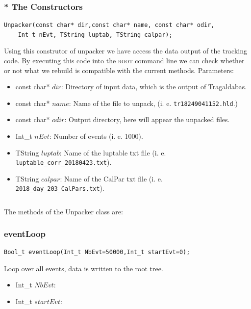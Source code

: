 \documentclass[a4paper]{book}
\begin{document}
\subsubsection{* The Constructors}

\begin{lstlisting}
Unpacker(const char* dir,const char* name, const char* odir, 
	Int_t nEvt, TString luptab, TString calpar);
\end{lstlisting}

Using this construtor of unpacker we have access the data output of the tracking code. By executing this code into the \textsc{root} command line we can check whether or not what we rebuild is compatible with the current methods. Parameters:

\begin{itemize}
	\item const char* $dir$: Directory of input data, which is the output of Tragaldabas.
	\item const char* $name$: Name of the file to unpack, (i. e. \texttt{tr18249041152.hld}.)
	\item const char* $odir$: Output directory, here will appear the unpacked files.
	\item Int\_t $nEvt$: Number of events (i. e. 1000).
	\item TString $luptab$: Name of the luptable txt file (i. e. \texttt{luptable\_corr\_20180423.txt}).
	\item TString $calpar$: Name of the CalPar txt file (i. e. \texttt{2018\_day\_203\_CalPars.txt}).
\end{itemize}

\[\]

The methods of the Unpacker class are:

\subsubsection{eventLoop}

\begin{lstlisting}
Bool_t eventLoop(Int_t NbEvt=50000,Int_t startEvt=0);
\end{lstlisting}

Loop over all events, data is written to the root tree.

\begin{itemize}
	\item Int\_t $NbEvt$: 
	\item Int\_t $startEvt$: 
\end{itemize}
\end{document}
